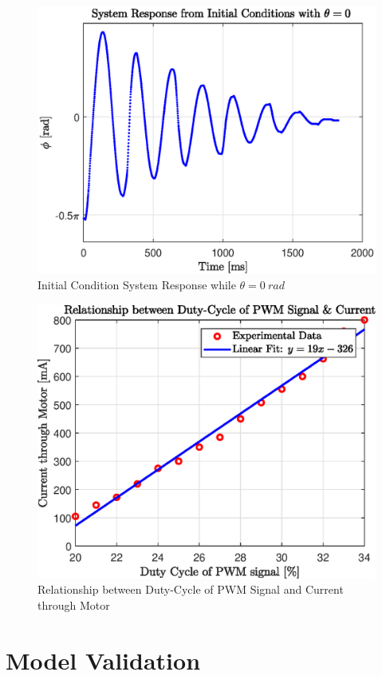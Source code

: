 \begin{figure}[h]
	\centering
	\includegraphics[scale=1]{./figs/q2_initial_response.eps}
	\caption{Initial Condition System Response while $ \theta = \SI{0}{rad} $ }
	\label{fig:q2_response}
\end{figure}

\begin{figure}[h]
	\centering
	\includegraphics[scale=1]{./figs/dutycycle_vs_current.eps}
	\caption{Relationship between Duty-Cycle of PWM Signal and Current through Motor}
	\label{fig:dutycycle_vs_current}
\end{figure}
\section{Model Validation}